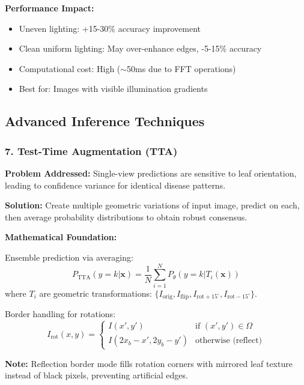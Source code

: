 \documentclass[12pt,a4paper]{article}
\begin{document}
\textbf{Performance Impact:}
\begin{itemize}
    \item Uneven lighting: +15-30\% accuracy improvement
    \item Clean uniform lighting: May over-enhance edges, -5-15\% accuracy
    \item Computational cost: High ($\sim$50ms due to FFT operations)
    \item Best for: Images with visible illumination gradients
\end{itemize}

\subsection*{Advanced Inference Techniques}

\subsubsection*{7. Test-Time Augmentation (TTA)}

\textbf{Problem Addressed:} Single-view predictions are sensitive to leaf orientation, leading to confidence variance for identical disease patterns.

\textbf{Solution:} Create multiple geometric variations of input image, predict on each, then average probability distributions to obtain robust consensus.

\textbf{Mathematical Foundation:}

Ensemble prediction via averaging:
\begin{equation*}
    P_{\text{TTA}}(y = k | \mathbf{x}) = \frac{1}{N} \sum_{i=1}^{N} P_{\theta}(y = k | T_i(\mathbf{x}))
\end{equation*}
where $T_i$ are geometric transformations: $\{I_{\text{orig}}, I_{\text{flip}}, I_{\text{rot}+15^{\circ}}, I_{\text{rot}-15^{\circ}}\}$.

Border handling for rotations:
\begin{equation*}
    I_{\text{rot}}(x, y) = \begin{cases}
        I(x', y') & \text{if } (x', y') \in \Omega \\
        I(2x_b - x', 2y_b - y') & \text{otherwise (reflect)}
    \end{cases}
\end{equation*}

\textbf{Note:} Reflection border mode fills rotation corners with mirrored leaf texture instead of black pixels, preventing artificial edges.
\end{document}
